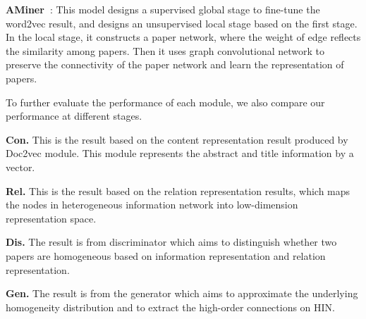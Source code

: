 \documentclass[letterpaper]{article} %
\begin{document}
\textbf{AMiner~\cite{JieTang}}: This model designs a supervised global stage to fine-tune the word2vec result, and designs an unsupervised local stage based on the first stage. In the local stage, it constructs a paper network, where the weight of edge reflects the similarity among papers. Then it uses graph convolutional network to preserve the connectivity of the paper network and learn the representation of papers.


To further evaluate the performance of each module, we also compare our performance at different stages.

\textbf{Con.} This is the result based on the content representation result produced by Doc2vec module. This module represents the abstract and title information by a vector.

\textbf{Rel.} This is the result based on the relation representation results, which maps the nodes in heterogeneous information network into low-dimension representation space.

\textbf{Dis.} The result is from discriminator which aims to distinguish whether two papers are homogeneous based on information representation and relation representation.

\textbf{Gen.} The result is from the generator which aims to approximate the underlying homogeneity distribution and to extract the high-order connections on HIN.

\end{document}
